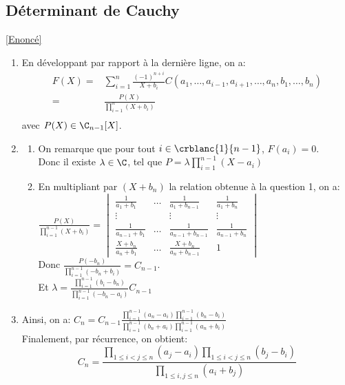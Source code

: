 \documentclass[8pt]{book}
\begin{document}
	\subsection{Déterminant de Cauchy }
	\label{Déterminant de Cauchy corrigé}
	\textcolor{blue}{\hyperref[Déterminant de Cauchy]{[Enoncé]}}\\
	\begin{enumerate}
		\item En développant par rapport à la dernière ligne, on a:
		\begin{align*}
			F(X)=&\displaystyle\sum_{i=1}^n\frac{(-1)^{n+i}}{X+b_i}C(a_1,\dots,a_{i-1},a_{i+1},\dots,a_n,b_1,\dots,b_n)\\
			=&\frac{P(X)}{\displaystyle\prod_{i=1}^n(X+b_i)}\\
		\end{align*}
		avec $P(X)\in\C_{n-1}[X]$.
		\item \begin{enumerate}[label=\alph*.]
			\item On remarque que pour tout $i\in\crblanc{1}{n-1}$, $F(a_i)=0$.
			\\Donc il existe $\lambda\in\C$, tel que $P=\lambda\displaystyle\prod_{i=1}^{n-1}(X-a_i)$
			\item En multipliant par $(X+b_n)$ la relation obtenue à la question 1, on a:
			\\$\displaystyle\frac{P(X)}{\displaystyle\prod_{i=1}^{n-1}(X+b_i)}=\begin{vmatrix}
				\frac{1}{a_1+b_1} &\dots& \frac{1}{a_1+b_{n-1}}&\frac{1}{a_1+b_n}\\
				\vdots&&\vdots&\vdots\\
				\frac{1}{a_{n-1}+b_1}& \dots & \frac{1}{a_{n-1}+b_{n-1}}& \frac{1}{a_{n-1}+b_n}\\
				\frac{X+b_n}{a_n+b_1}& \dots& \frac{X+b_n}{a_n+b_{n-1}}& 1
			\end{vmatrix}$
			\\Donc $\displaystyle\frac{P(-b_n)}{\prod_{i=1}^{n-1}(-b_n+b_i)}=C_{n-1}$.
			\\Et $\lambda=\displaystyle\frac{\displaystyle\prod_{i=1}^{n-1}(b_i-b_n)}{\displaystyle\prod_{i=1}^{n-1}(-b_n-a_i)}C_{n-1}$
		\end{enumerate}
		\item Ainsi, on a: $C_n=C_{n-1}\displaystyle\frac{\displaystyle\prod_{i=1}^{n-1}(a_n-a_i)\prod_{i=1}^{n-1}(b_n-b_i)}{\displaystyle\prod_{i=1}^{n-1}(b_n+a_i)\prod_{i=1}^{n-1}(a_n+b_i)}$
		\\Finalement, par récurrence, on obtient: $$C_n=\frac{\displaystyle\prod_{1\leq i<j\leq n}(a_j-a_i)\prod_{1\leq i<j\leq n}(b_j-b_i)}{\displaystyle\prod_{1\leq i,j\leq n}(a_i+b_j)}$$
	\end{enumerate}
\end{document}

